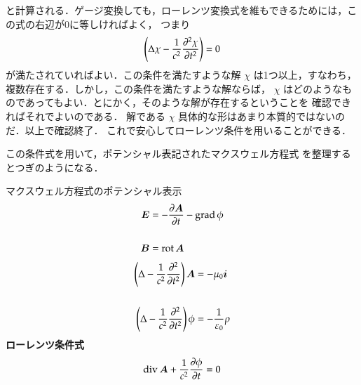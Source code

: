             と計算される．ゲージ変換しても，ローレンツ変換式を維もできるためには，この式の右辺が0に等しければよく，
            つまり
                            \begin{align}
                                \left(
                                    \Delta\chi
                                -\frac{1}{c^{2}}\frac{\partial^{2} \chi}{\partial t^{2}}
                                \right)
                                =0
                            \end{align}
            が満たされていればよい．この条件を満たすような解 $\chi$ は1つ以上，すなわち，
            複数存在する．しかし，この条件を満たすような解ならば，
            $\chi$ はどのようなものであってもよい．とにかく，そのような解が存在するということを
            確認できればそれでよいのである．
            解である $\chi$ 具体的な形はあまり本質的ではないのだ．以上で確認終了．
            これで安心してローレンツ条件を用いることができる．


            この条件式を用いて，ポテンシャル表記されたマクスウェル方程式
            を整理するとつぎのようになる．
               \begin{myshadebox}{マクスウェル方程式のポテンシャル表示}
                        \begin{align}
                            \bE&=-\displaystyle
                            \frac{\rd\bA}{\rd t}-\mathrm{grad\,}\phi \\ \notag \\
                            \vspace{2mm}
                            \bB&=\mathrm{rot\,}\bA
                    \end{align}
                    \begin{align}
                            \left(\Delta
                            -\frac{1}{c^{2}}\frac{\rd^{2}}{\rd t^{2}}\right)\bA
                            &=-\mu_{0}\bi  \\\,\vspace{2mm} \notag \\
                            \left(\Delta
                            -\frac{1}{c^{2}}\frac{\rd^{2} }{\rd t^{2}}\right)\phi
                            &=-\frac{1}{\varepsilon_{0}}\rho
                    \end{align}
                        \textbf{ローレンツ条件式}
                            \begin{align}
                                \mathrm{div\,}\boldsymbol{A}
                                +\frac{1}{c^{2}}\frac{\partial \phi}{\partial t}
                                =0
                            \end{align}
               \end{myshadebox}


